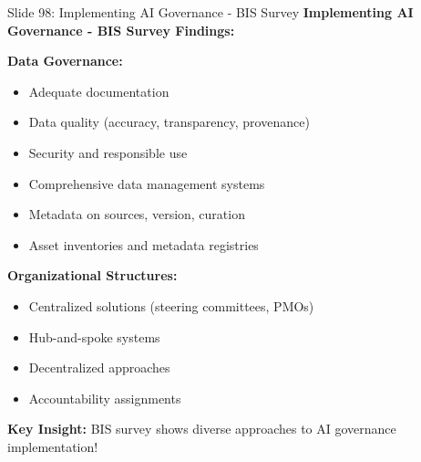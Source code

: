 \documentclass[8pt]{beamer}
\begin{document}
	\begin{frame}{Slide 98: Implementing AI Governance - BIS Survey}
		\fontsize{6.5}{7.5}\selectfont
		\textbf{Implementing AI Governance - BIS Survey Findings:}
		
		\vspace{0.1cm}
		\textbf{Data Governance:}
		\begin{itemize}
			\item Adequate documentation
			\item Data quality (accuracy, transparency, provenance)
			\item Security and responsible use
			\item Comprehensive data management systems
			\item Metadata on sources, version, curation
			\item Asset inventories and metadata registries
		\end{itemize}
		
		\vspace{0.1cm}
		\textbf{Organizational Structures:}
		\begin{itemize}
			\item Centralized solutions (steering committees, PMOs)
			\item Hub-and-spoke systems
			\item Decentralized approaches
			\item Accountability assignments
		\end{itemize}
		
		\textcolor{myblue}{\textbf{Key Insight:}} BIS survey shows \textcolor{myblue}{diverse approaches to AI governance implementation}!
	\end{frame}
	
\end{document}
